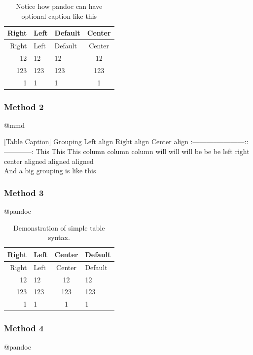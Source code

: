 \documentclass[]{article}
\begin{document}
\begin{longtable}[]{@{}rllc@{}}
\caption{Notice how pandoc can have optional caption like
this}\tabularnewline
\toprule
Right & Left & Default & Center\tabularnewline
\midrule
\endfirsthead
\toprule
Right & Left & Default & Center\tabularnewline
\midrule
\endhead
12 & 12 & 12 & 12\tabularnewline
123 & 123 & 123 & 123\tabularnewline
1 & 1 & 1 & 1\tabularnewline
\bottomrule
\end{longtable}

\subsubsection{Method 2}\label{method-2-2}

@mmd

{[}Table Caption{]} \textbar{} \textbar{} Grouping \textbar{}\textbar{}
\textbar{} Left align \textbar{} Right align \textbar{} Center align
\textbar{}
\textbar{}:-----------\textbar{}------------:\textbar{}:------------:\textbar{}
\textbar{} This \textbar{} This \textbar{} This \textbar{} \textbar{}
column \textbar{} column \textbar{} column \textbar{} \textbar{} will
\textbar{} will \textbar{} will \textbar{} \textbar{} be \textbar{} be
\textbar{} be \textbar{} \textbar{} left \textbar{} right \textbar{}
center \textbar{} \textbar{} aligned \textbar{} aligned \textbar{}
aligned \textbar{}\\
\textbar{} And a big grouping is like this
\textbar{}\textbar{}\textbar{}

\subsubsection{Method 3}\label{method-3-1}

@pandoc

\begin{longtable}[]{@{}rlcl@{}}
\caption{Demonstration of simple table syntax.}\tabularnewline
\toprule
Right & Left & Center & Default\tabularnewline
\midrule
\endfirsthead
\toprule
Right & Left & Center & Default\tabularnewline
\midrule
\endhead
12 & 12 & 12 & 12\tabularnewline
123 & 123 & 123 & 123\tabularnewline
1 & 1 & 1 & 1\tabularnewline
\bottomrule
\end{longtable}

\subsubsection{Method 4}\label{method-4}

@pandoc
\end{document}
